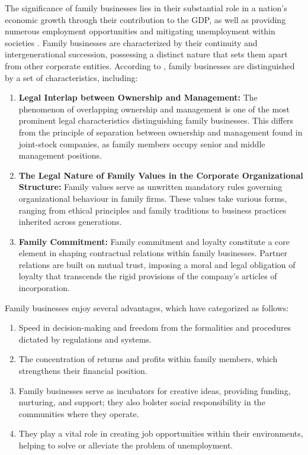 \documentclass[10pt]{NSP1}
\begin{document}
The significance of family businesses lies in their substantial role in a nation's economic growth through their contribution to the GDP, as well as providing numerous employment opportunities and mitigating unemployment within societies \cite{Fatiha2020, Hamdi2019}. Family businesses are characterized by their continuity and intergenerational succession, possessing a distinct nature that sets them apart from other corporate entities. According to \cite{AlSiyabi2025}, family businesses are distinguished by a set of characteristics, including:

\begin{enumerate}
    \item \textbf{Legal Interlap between Ownership and Management:} The phenomenon of overlapping ownership and management is one of the most prominent legal characteristics distinguishing family businesses. This differs from the principle of separation between ownership and management found in joint-stock companies, as family members occupy senior and middle management positions.
    \item \textbf{The Legal Nature of Family Values in the Corporate Organizational Structure:} Family values serve as unwritten mandatory rules governing organizational behaviour in family firms. These values take various forms, ranging from ethical principles and family traditions to business practices inherited across generations.
    \item \textbf{Family Commitment:} Family commitment and loyalty constitute a core element in shaping contractual relations within family businesses. Partner relations are built on mutual trust, imposing a moral and legal obligation of loyalty that transcends the rigid provisions of the company's articles of incorporation.
\end{enumerate}

Family businesses enjoy several advantages, which \cite{Darwish2025, Salman2011} have categorized as follows:

\begin{enumerate}
    \item Speed in decision-making and freedom from the formalities and procedures dictated by regulations and systems.
    \item The concentration of returns and profits within family members, which strengthens their financial position.
    \item Family businesses serve as incubators for creative ideas, providing funding, nurturing, and support; they also bolster social responsibility in the communities where they operate.
    \item They play a vital role in creating job opportunities within their environments, helping to solve or alleviate the problem of unemployment.
\end{enumerate}
\end{document}
